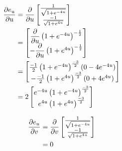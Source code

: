 \documentclass[a4paper, 11pt]{article}
\begin{document}
\begin{enumerate}[label=(\alph*)]
        \begin{mdframed}
          \begin{minipage}[t]{0.5\textwidth}
            \begin{align*}
              \dfrac{\partial e_u}{\partial u} & = \dfrac{\partial}{\partial u}\begin{bmatrix}
                                    \frac{1}{\sqrt{1 + e^{-4u}}} \\
                                    \frac{-1}{\sqrt{1 + e^{4u}}}
                                  \end{bmatrix}                       \\
                        & = \begin{bmatrix}
                              \dfrac{\partial}{\partial u}\left( 1 + e^{-4u} \right)^{-\frac 12} \\
                              -\dfrac{\partial}{\partial u}\left(1 + e^{4u} \right)^{-\frac 12}
                            \end{bmatrix}                 \\
                        & =  \begin{bmatrix}
                               \frac{-1}2\left( 1+e^{-4u} \right)^{\frac{-3}2}(0-4e^{-4u}) \\
                               -\frac{-1}2\left( 1+e^{4u} \right)^{\frac{-3}2}(0+4e^{4u})
                             \end{bmatrix} \\
                        & =  2\begin{bmatrix}
                                e^{-4u}\left( 1+e^{-4u} \right)^{\frac{-3}2} \\
                                e^{4u}\left( 1+e^{4u} \right)^{\frac{-3}2}
                              \end{bmatrix}
            \end{align*}
          \end{minipage}\begin{minipage}[t]{0.5\textwidth}
            \begin{align*}
              \dfrac{\partial e_u}{\partial v} & = \dfrac{\partial}{\partial v}\begin{bmatrix}
                                    \frac{1}{\sqrt{1 + e^{-4u}}} \\
                                    \frac{-1}{\sqrt{1 + e^{4u}}}
                                  \end{bmatrix} \\
                        & = 0
            \end{align*}
          \end{minipage}


\end{mdframed}
\end{enumerate}
\end{document}

